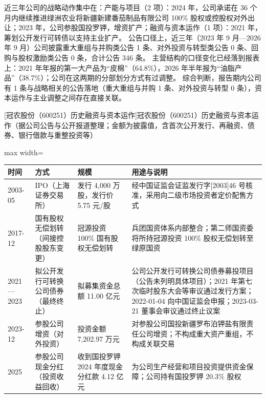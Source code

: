 近三年公司的战略动作集中在：产能与项目（2 项）：2024 年，公司承诺在 36 个月内继续推进绿洲农业将新疆新建番茄制品有限公司 100\% 股权或控股权对外出让；2023 年，公司参股国投罗钾，增资扩产；融资与资本运作（1 项）：2021 年，筹划公开发行可转债以支持主业扩产。 公告口径上，近三年（2023 年 9 月---2026 年 9 月）公司披露重大重组与并购类公告 1 条、对外投资与转型类公告 0 条、回购与股权激励类公告 0 条，合计公告 346 条。 主营结构的口径变化已经落到报表上：2021 年年报的第一大产品为“皮棉”（64.8\%），2026 年半年报为“油脂产品”（38.7\%）；公司在这两期的分部划分方式有过调整。 综合判断，报告期内公司有 1 条与战略相关的公告落地（重大重组与并购 1 条、对外投资与转型 0 条），资本运作与主业调整之间存在直接关联。

\begin{center}\small\setlength{\tabcolsep}{4pt}
[冠农股份（600251）历史融资与资本运作]{冠农股份（600251）历史融资与资本运作（据公司公告与公开报道整理；金额为披露值，含首次公开发行、再融资、债券、银行借款与重整投资等）}
\begin{adjustbox}{max width=\textwidth}
\begin{tabular}{@{}p{1.45cm}p{2.55cm}p{4.05cm}p{4.95cm}@{}}
\toprule
时间 & 方式 & 规模 & 用途与说明 \\
\midrule
2003-05 & IPO（上海证券交易所） & 发行 4,\allowbreak{}000 万股，\allowbreak{}发行价 5.75 元/\allowbreak{}股 & 经中国证监会证监发行字[2003]46 号核准，\allowbreak{}采用向二级市场投资者定价配售方式 \\
2017-12 & 国有股权无偿划转（间接控股股东变更） & 冠源投资 100\% 国有股权无偿划转 & 兵团国资体系内部整合；第二师国资委将所持冠源投资 100\% 股权无偿划转至绿原国资 \\
2021—2023 & 拟公开发行可转换公司债券（最终终止） & 拟募集资金总额 11.00 亿元 & 公司公开发行可转换公司债券募投项目（公告未列明具体项目）；2021 年第七次临时股东大会等审议通过发行方案；2022-01-04 向中国证监会申报；2023-03-21 董事会审议通过终止议案 \\
2023-12 & 参股公司增资（对外投资） & 投资金额 7,\allowbreak{}202.97 万元 & 对参股公司国投新疆罗布泊钾盐有限责任公司增资；不构成重大资产重组，\allowbreak{}不构成关联交易 \\
2025 & 参股公司现金分红（投资收益回收） & 收到国投罗钾 2024 年度现金分红款 4.12 亿元 & 为公司生产经营和项目投资提供资金保障；公司持有国投罗钾 20.3\% 股权 \\
\bottomrule
\end{tabular}
\end{adjustbox}
\end{center}

